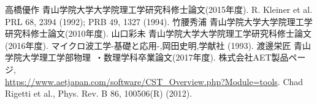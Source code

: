 \begin{thebibliography}{9}
   高橋優作 青山学院大学大学院理工学研究科修士論文(2015年度).
   R. Kleiner et al. PRL 68, 2394 (1992); PRB 49, 1327 (1994).
   竹腰秀浦 青山学院大学大学院理工学研究科修士論文(2010年度).
   山口彩未 青山学院大学大学院理工学研究科修士論文(2016年度).
   マイクロ波工学-基礎と応用-,岡田史明,学献社 (1993).
   渡邊栄匠 青山学院大学理工学部物理 ・数理学科卒業論文(2017年度).
   株式会社AET製品ページ,\\ \url{https://www.aetjapan.com/software/CST_Overview.php?Module=tools}.
   Chad Rigetti et al., Phys. Rev. B 86, 100506(R) (2012).
\end{thebibliography}
